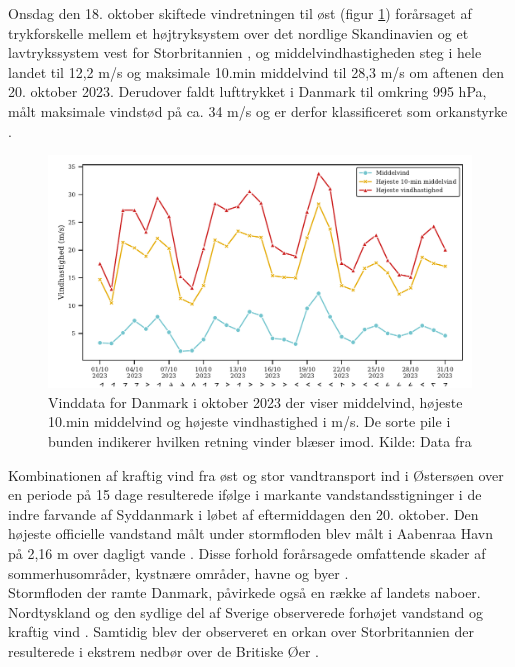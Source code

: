 Onsdag den 18. oktober skiftede vindretningen til øst (figur \ref{Figur: Vinddata Danmark}) forårsaget af trykforskelle mellem et højtryksystem over det nordlige Skandinavien og et lavtrykssystem vest for Storbritannien \citep{kiesel_brief_2024}, og middelvindhastigheden steg i hele landet til 12,2 m/s og maksimale 10.min middelvind til 28,3 m/s om aftenen den 20. oktober 2023. Derudover faldt lufttrykket i Danmark til omkring 995 hPa, målt maksimale vindstød på ca. 34 m/s og er derfor klassificeret som orkanstyrke \citep{dmi_vejrarkiv}. 
\begin{figure} [H]
    \centering
    \includegraphics[width=0.9\linewidth]{images/teori/vinddata_grafer/Danmark_vinddata.pdf}
    \caption{Vinddata for Danmark i oktober 2023 der viser middelvind, højeste 10.min middelvind og højeste vindhastighed i m/s. De sorte pile i bunden indikerer hvilken retning vinder blæser imod. Kilde: Data fra \cite{dmi_vejrarkiv} }
    \label{Figur: Vinddata Danmark}
\end{figure}

Kombinationen af kraftig vind fra øst og stor vandtransport ind i Østersøen over en periode på 15 dage resulterede ifølge \cite{kystdirektoratet_stormflod2023} i markante vandstandsstigninger i de indre farvande af Syddanmark i løbet af eftermiddagen den 20. oktober. Den højeste officielle vandstand målt under stormfloden blev målt i Aabenraa Havn på 2,16 m over dagligt vande \citep{damberg_vaerste_2023}. Disse forhold forårsagede omfattende skader af sommerhusområder, kystnære områder, havne og byer \citep{kystdirektoratet_stormflod2023, naturskaderadet_anmeldelser_2023}. \\
Stormfloden der ramte Danmark, påvirkede også en række af landets naboer. Nordtyskland og den sydlige del af Sverige observerede forhøjet vandstand og kraftig vind \citep{kiesel_brief_2024}. Samtidig blev der observeret en orkan over Storbritannien der resulterede i ekstrem nedbør over de Britiske Øer \citep{met_office_storm_2023}.  




